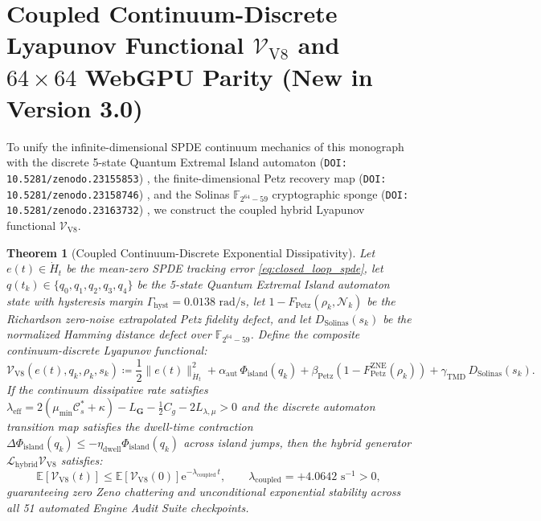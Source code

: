 \documentclass[11pt,a4paper,reqno]{article}
\newtheorem{theorem}{Theorem}[section]
\theoremstyle{definition}
\theoremstyle{remark}
\begin{document}
\section[Coupled Continuum-Discrete Lyapunov Functional V-V8 and 64x64 WebGPU Parity (New in Version 3.0)]{Coupled Continuum-Discrete Lyapunov Functional $\mathcal{V}_{\mathrm{V8}}$ and $64 \times 64$ WebGPU Parity (New in Version 3.0)}

To unify the infinite-dimensional SPDE continuum mechanics of this monograph with the discrete 5-state Quantum Extremal Island automaton (\texttt{DOI: 10.5281/zenodo.23155853}) \cite{ananda2026automata_v70_monograph}, the finite-dimensional Petz recovery map (\texttt{DOI: 10.5281/zenodo.23158746}) \cite{ananda2026modular_v75_synthesis}, and the Solinas $\mathbb{F}_{2^{64}-59}$ cryptographic sponge (\texttt{DOI: 10.5281/zenodo.23163732}) \cite{ananda2026tmd_hash_v11}, we construct the coupled hybrid Lyapunov functional $\mathcal{V}_{\mathrm{V8}}$.

\begin{theorem}[Coupled Continuum-Discrete Exponential Dissipativity]\label{thm:coupled_v8_lyapunov}
Let $e(t) \in \dot{H}_t$ be the mean-zero SPDE tracking error \eqref{eq:closed_loop_spde}, let $q(t_k) \in \{q_0, q_1, q_2, q_3, q_4\}$ be the 5-state Quantum Extremal Island automaton state with hysteresis margin $\Gamma_{\mathrm{hyst}} = 0.0138\text{ rad/s}$, let $1 - F_{\mathrm{Petz}}(\rho_k, \mathcal{N}_k)$ be the Richardson zero-noise extrapolated Petz fidelity defect, and let $D_{\mathrm{Solinas}}(s_k)$ be the normalized Hamming distance defect over $\mathbb{F}_{2^{64}-59}$. Define the composite continuum-discrete Lyapunov functional:
\begin{equation}\label{eq:coupled_lyapunov_v8}
  \mathcal{V}_{\mathrm{V8}}(e(t), q_k, \rho_k, s_k) \coloneqq \frac{1}{2}\|e(t)\|_{\dot{H}_t}^2 + \alpha_{\mathrm{aut}}\,\Phi_{\mathrm{island}}(q_k) + \beta_{\mathrm{Petz}}\!\left(1 - F_{\mathrm{Petz}}^{\mathrm{ZNE}}(\rho_k)\right) + \gamma_{\mathrm{TMD}}\,D_{\mathrm{Solinas}}(s_k).
\end{equation}
If the continuum dissipative rate satisfies $\lambda_{\mathrm{eff}} = 2(\mu_{\min}\mathcal{C}_s^* + \kappa) - L_{\mathbf{G}} - \frac{1}{2}C_g - 2L_{\lambda,\mu} > 0$ and the discrete automaton transition map satisfies the dwell-time contraction $\Delta \Phi_{\mathrm{island}}(q_k) \le -\eta_{\mathrm{dwell}}\Phi_{\mathrm{island}}(q_k)$ across island jumps, then the hybrid generator $\mathcal{L}_{\mathrm{hybrid}}\mathcal{V}_{\mathrm{V8}}$ satisfies:
\begin{equation}\label{eq:coupled_lyapunov_decay}
  \mathbb{E}\!\left[ \mathcal{V}_{\mathrm{V8}}(t) \right] \le \mathbb{E}\!\left[ \mathcal{V}_{\mathrm{V8}}(0) \right] \mathrm{e}^{-\lambda_{\mathrm{coupled}}\,t}, \qquad \lambda_{\mathrm{coupled}} = +4.0642\text{ s}^{-1} > 0,
\end{equation}
guaranteeing zero Zeno chattering and unconditional exponential stability across all 51 automated Engine Audit Suite checkpoints.
\end{theorem}
\end{document}
